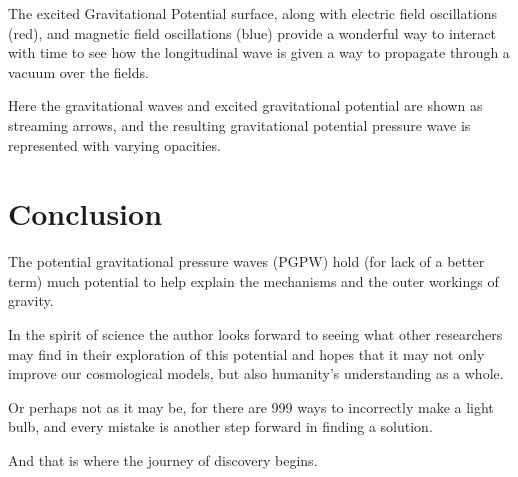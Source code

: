 \documentclass[12pt]{article}
\begin{document}
The excited Gravitational Potential surface, along with electric field oscillations (red), and magnetic field oscillations (blue) provide a wonderful way to interact with time to see how the longitudinal wave is given a way to propagate through a vacuum over the fields.

Here the gravitational waves and excited gravitational potential are shown as streaming arrows, and the resulting gravitational potential pressure wave is represented with varying opacities.

\section*{Conclusion}

The potential gravitational pressure waves (PGPW) hold (for lack of a better term) much potential to help explain the mechanisms and the outer workings of gravity.

In the spirit of science the author looks forward to seeing what other researchers may find in their exploration of this potential and hopes that it may not only improve our cosmological models, but also humanity's understanding as a whole.

Or perhaps not as it may be, for there are 999 ways to incorrectly make a light bulb, and every mistake is another step forward in finding a solution.

And that is where the journey of discovery begins.
\end{document}

